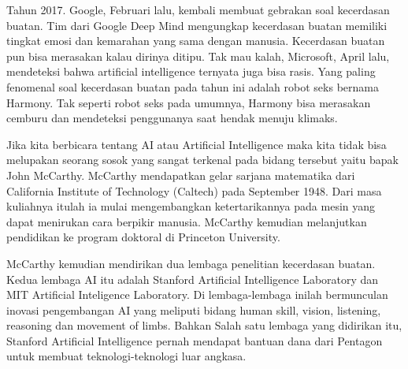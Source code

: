 \begin{itemize}
\begin{itemize}
\par Tahun 2017. Google, Februari lalu, kembali membuat gebrakan soal kecerdasan buatan. Tim dari Google Deep Mind mengungkap kecerdasan buatan memiliki tingkat emosi dan kemarahan yang sama dengan manusia. Kecerdasan buatan pun bisa merasakan kalau dirinya ditipu. Tak mau kalah, Microsoft, April lalu, mendeteksi bahwa artificial intelligence ternyata juga bisa rasis.
Yang paling fenomenal soal kecerdasan buatan pada tahun ini adalah robot seks bernama Harmony. Tak seperti robot seks pada umumnya, Harmony bisa merasakan cemburu dan mendeteksi penggunanya saat hendak menuju klimaks.
\par Jika kita berbicara tentang AI atau Artificial Intelligence maka kita tidak bisa melupakan seorang sosok yang sangat terkenal pada bidang tersebut yaitu bapak John McCarthy.
McCarthy mendapatkan gelar sarjana matematika dari California Institute of Technology (Caltech) pada September 1948. Dari masa kuliahnya itulah ia mulai mengembangkan ketertarikannya pada mesin yang dapat menirukan cara berpikir manusia. McCarthy kemudian melanjutkan pendidikan ke program doktoral di Princeton University.
\par McCarthy kemudian mendirikan dua lembaga penelitian kecerdasan buatan. Kedua lembaga AI itu adalah Stanford Artificial Intelligence Laboratory dan MIT Artificial Inteligence Laboratory. Di lembaga-lembaga inilah bermunculan inovasi pengembangan AI yang meliputi bidang human skill, vision, listening, reasoning dan movement of limbs. Bahkan Salah satu lembaga yang didirikan itu, Stanford Artificial Intelligence pernah mendapat bantuan dana dari Pentagon untuk membuat teknologi-teknologi luar angkasa.


\end{itemize}
\end{itemize}
